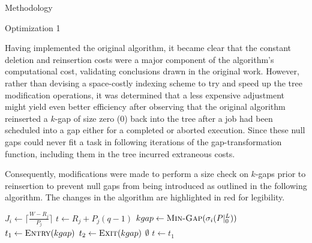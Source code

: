 \documentclass{article}
\begin{document}
\begin{section}{Methodology}
  \begin{subsection}{Optimization 1}
    \begin{paragraph}{}
      Having implemented the original algorithm, it became clear that the constant
      deletion and reinsertion costs were a major component of the algorithm's
      computational cost, validating conclusions drawn in the original work\autocite[17]{BelwalCheng}. However, rather than devising a space-costly indexing scheme to try and speed
      up the tree modification operations, it was determined that a less expensive
      adjustment might yield even better efficiency after observing that the original
      algorithm reinserted a $k$-gap of size zero (0) back into the tree after a job
      had been scheduled into a gap either for a completed or aborted execution.
      Since these null gaps could never fit a task in following iterations of the
      gap-transformation function, including them in the tree incurred extraneous costs.
    \end{paragraph}
    \begin{paragraph}{}
      Consequently, modifications were made to perform a size check
      on $k$-gaps prior to reinsertion to prevent null gaps from being introduced
      as outlined in the following algorithm. The changes in the algorithm are
      highlighted in red for legibility.
    \begin{algorithm}[H]
      \caption{Gap-Tranformation Algorithm Optimization 1: No Zero Gaps Reinserted}\label{gapxfrm2}
      \begin{algorithmic}[2]
          \State $J_{i} \gets \lceil\frac{W - R_{j}}{P_{j}}\rceil$
            \State $t \gets R_{j} + P_{j}(q-1)$
            \State $kgap \gets \Call{Min-Gap}{\sigma_{i}(P|_{0}^{L})}$
            \State $t_{1} \gets \Call{Entry}{kgap}$
            \State $t_{2} \gets \Call{Exit}{kgap}$
                \State \Return $\emptyset$
              \EndIf
                \State $t \gets t_{1}$
              \EndIf
                \State \Call{Gap-Delete}{$\sigma_{i}(P|_{0}^{L}), [t_{1},t_{2})$}
                    \State \Call{Gap-Insert}{$\sigma_{i}(P|_{0}^{L}), [t_{1},t)$}
                  \NewEndIf

\end{algorithmic}
\end{algorithm}
\end{paragraph}
\end{subsection}
\end{section}
\end{document}
